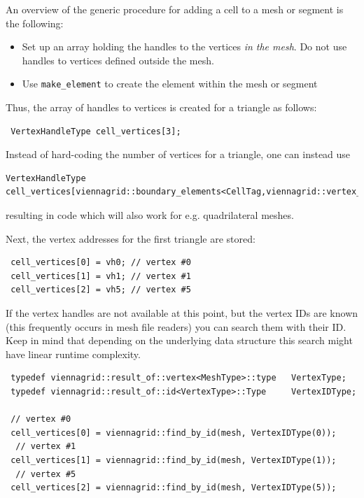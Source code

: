 

An overview of the generic procedure for adding a cell to a mesh or segment is the following:
  \begin{itemize}
   \item Set up an array holding the handles to the vertices \emph{in the mesh}. Do not use handles to vertices defined outside the mesh.
   \item Use \lstinline|make_element| to create the element within the mesh or segment
  \end{itemize}
Thus, the array of handles to vertices is created for a triangle as follows:
\begin{lstlisting}
 VertexHandleType cell_vertices[3];
\end{lstlisting}
Instead of hard-coding the number of vertices for a triangle, one can instead use
\begin{lstlisting}
VertexHandleType cell_vertices[viennagrid::boundary_elements<CellTag,viennagrid::vertex_tag>::num];
\end{lstlisting}
resulting in code which will also work for e.g. quadrilateral meshes.


Next, the vertex addresses for the first triangle are stored:
\begin{lstlisting}
 cell_vertices[0] = vh0; // vertex #0
 cell_vertices[1] = vh1; // vertex #1
 cell_vertices[2] = vh5; // vertex #5
\end{lstlisting}


If the vertex handles are not available at this point, but the vertex IDs are known (this frequently occurs in mesh file readers) you can search them with their ID.
Keep in mind that depending on the underlying data structure this search might have linear runtime complexity.
\begin{lstlisting}
 typedef viennagrid::result_of::vertex<MeshType>::type   VertexType;
 typedef viennagrid::result_of::id<VertexType>::Type     VertexIDType;

 // vertex #0
 cell_vertices[0] = viennagrid::find_by_id(mesh, VertexIDType(0));
  // vertex #1
 cell_vertices[1] = viennagrid::find_by_id(mesh, VertexIDType(1));
  // vertex #5
 cell_vertices[2] = viennagrid::find_by_id(mesh, VertexIDType(5));
\end{lstlisting}

